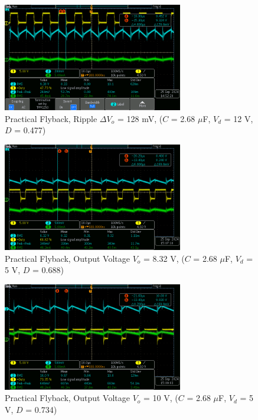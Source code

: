 \documentclass[12pt,twoside]{scrartcl}
\begin{document}
\begin{figure}[htp]
    \centering
    \includegraphics[width=0.7\textwidth]{Flyback/tek0002.png}
    \caption{Practical Flyback, Ripple $\Delta V_o$ = 128 mV, ($C$ = 2.68 $\mu$F, $V_d$ = 12 V, $D$ = 0.477)}
    \label{fig:Practical2}
\end{figure}

\begin{figure}[htp]
    \centering
    \includegraphics[width=0.7\textwidth]{Flyback/tek0003.png}
    \caption{Practical Flyback, Output Voltage $V_o$ = 8.32 V, ($C$ = 2.68 $\mu$F, $V_d$ = 5 V, $D$ = 0.688)}
    \label{fig:Practical3}
\end{figure}

\begin{figure}[htp]
    \centering
    \includegraphics[width=0.7\textwidth]{Flyback/tek0004.png}
    \caption{Practical Flyback, Output Voltage $V_o$ = 10 V, ($C$ = 2.68 $\mu$F, $V_d$ = 5 V, $D$ = 0.734)}
    \label{fig:Practical4}
\end{figure}
\end{document}
